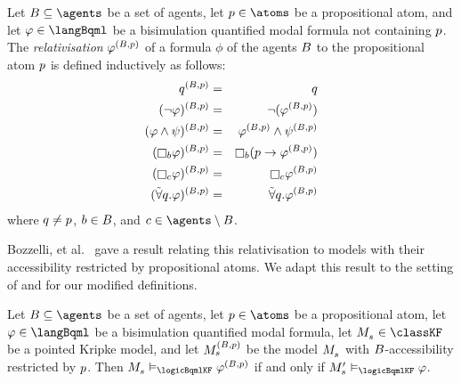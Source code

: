 \begin{definition}[Relativisation]
Let $\agentsB \subseteq \agents$ be a set of agents, let $\atomP \in \atoms$ be a propositional atom, and let $\phi \in \langBqml$ be a bisimulation quantified modal formula not containing $p$.
The {\em relativisation} $\varphi^{(B, p)}$ of a formula $\phi$ of the agents $B$ to the propositional atom $p$ is defined inductively as follows:
\begin{eqnarray*}
    \atomQ^{(\agentsB, \atomP)} &=& \atomQ\\
    (\lnot \phi)^{(\agentsB, \atomP)} &=& \lnot (\phi^{(\agentsB, \atomP)})\\
    (\phi \land \psi)^{(\agentsB, \atomP)} &=& \phi^{(\agentsB, \atomP)} \land \psi^{(\agentsB, \atomP)}\\
    (\necessaryB \phi)^{(\agentsB, \atomP)} &=& \necessaryB (\atomP \implies \phi^{(\agentsB, \atomP)})\\
    (\necessaryC \phi)^{(\agentsB, \atomP)} &=& \necessaryC \phi^{(\agentsB, \atomP)}\\
    (\allbisimsQ \phi)^{(\agentsB, \atomP)} &=& \allbisimsQ \phi^{(\agentsB, \atomP)}\\
\end{eqnarray*}
where $q \neq p$, $b \in B$, and $\agentC \in \agents \setminus \agentsB$.
\end{definition}

Bozzelli, et al.~\cite{bozzelli:2014b} gave a result relating this relativisation to models with their accessibility restricted by propositional atoms. 
We adapt this result to the setting of \classKF{} and for our modified definitions.

\begin{lemma}\label{rml-k4-relativisation-restriction}
Let $\agentsB \subseteq \agents$ be a set of agents, let $\atomP \in \atoms$ be a propositional atom, let $\phi \in \langBqml$ be a bisimulation quantified modal formula, let $\kPModel{\kStateS} \in \classKF$ be a pointed Kripke model, and let $\kPModel[(\agentsB, \atomP)]{\kStateS}$ be the model $\kPModel{\kStateS}$ with $B$-accessibility restricted by $p$.
Then $\kPModel{\kStateS} \entails_\logicBqmlKF \phi^{(\agentsB, \atomP)}$ if and only if $\kPModelP{\kStateS} \entails_\logicBqmlKF \phi$.
\end{lemma}

